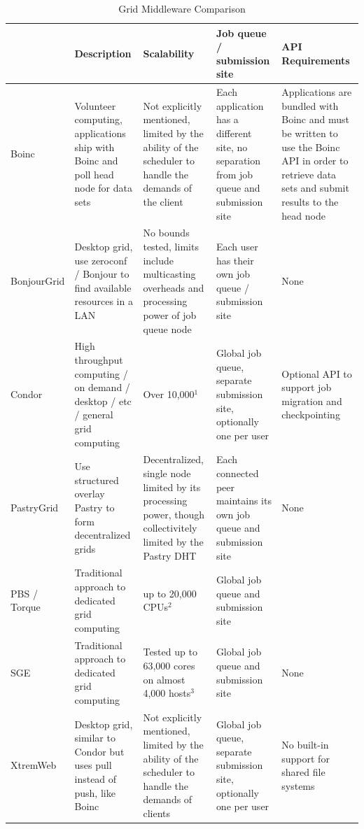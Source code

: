 \documentclass[conference]{IEEEtran}
\begin{document}
\begin{table}[ht]
\small{
\centering
\begin{tabular}[c]{|p{1.4cm}||p{3.475cm}|p{3.475cm}|p{3.475cm}|p{3.475cm}|} \hline
& Description & Scalability & Job queue / submission site & API Requirements \\ \hline \hline
Boinc &
Volunteer computing, applications ship with Boinc and poll head node for data
sets &
Not explicitly mentioned, limited by the ability of the scheduler to handle
the demands of the client &
Each application has a different site, no separation from job queue and
submission site &
Applications are bundled with Boinc and must be written to use the Boinc API
in order to retrieve data sets and submit results to the head node
\\ \hline
BonjourGrid &
Desktop grid, use zeroconf / Bonjour to find available resources in a LAN &
No bounds tested, limits include multicasting overheads and processing power
of job queue node &
Each user has their own job queue / submission site &
None \\ \hline
Condor &
High throughput computing / on demand / desktop / etc / general grid computing &
Over 10,000$^{1}$ &
Global job queue, separate submission site, optionally one per user &
Optional API to support job migration and checkpointing \\ \hline
PastryGrid &
Use structured overlay Pastry to form decentralized grids &
Decentralized, single node limited by its processing power, though
collectivitely limited by the Pastry DHT &
Each connected peer maintains its own job queue and submission site &
None \\ \hline
PBS / Torque~\cite{torque} &
Traditional approach to dedicated grid computing &
up to 20,000 CPUs$^{2}$ &
Global job queue and submission site &
\\ \hline
SGE &
Traditional approach to dedicated grid computing &
Tested up to 63,000 cores on almost 4,000 hosts$^{3}$ &
Global job queue and submission site &
None
\\ \hline
XtremWeb &
Desktop grid, similar to Condor but uses pull instead of push, like Boinc &
Not explicitly mentioned, limited by the ability of the scheduler to handle
the demands of clients &
Global job queue, separate submission site, optionally one per user &
No built-in support for shared file systems
\\ \hline
\end{tabular}
\caption{Grid Middleware Comparison}
\label{tab:grid}
}
\end{table}
\end{document}
